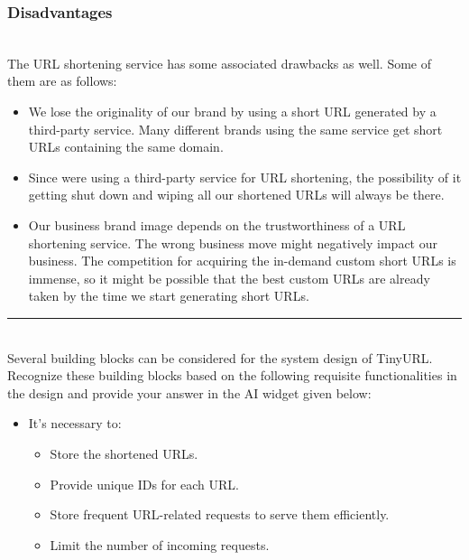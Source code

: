 \subsubsection{Disadvantages}\label{vKyduEge_YamkiCV7UkwX}
\\
The URL shortening service has some associated drawbacks as well. Some of them are as follows:

\begin{itemize}
\item
\protect{}\label{HWbCL-367dHhT2B2V7JII}
We lose the originality of our brand by using a short URL generated by a third-party service. Many different brands using the same service get short URLs containing the same domain.
\item
\protect{}\label{7mahErh8WcRgn1zmL1emN}
Since we\textquotesingle re using a third-party service for URL shortening, the possibility of it getting shut down and wiping all our shortened URLs will always be there.
\item
\protect{}\label{5Q55hNJkqBCnLW518j67Y}
Our business brand image depends on the trustworthiness of a URL shortening service. The wrong business move might negatively impact our business. The competition for acquiring the in-demand custom short URLs is immense, so it might be possible that the best custom URLs are already taken by the time we start generating short URLs.
\end{itemize}

\begin{center}\rule{0.5\linewidth}{0.5pt}\end{center}
\\
Several building blocks can be considered for the system design of TinyURL. Recognize these building blocks based on the following requisite functionalities in the design and provide your answer in the AI widget given below:

\begin{itemize}
\item
It's necessary to:~

\begin{itemize}
\item
Store the shortened URLs.
\item
Provide unique IDs for each URL.
\item
Store frequent URL-related requests to serve them efficiently.~
\item
Limit the number of incoming requests.
\end{itemize}
\end{itemize}

